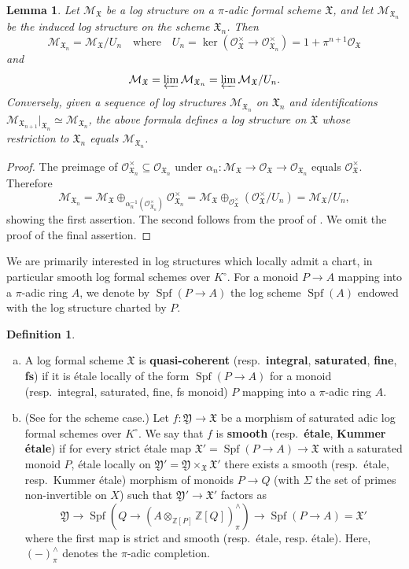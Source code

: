 \documentclass[a4paper,twoside,11pt,reqno]{amsart}
\renewcommand{\mathbb}{\mathds}
\newcommand{\bZ}{{\mathbb Z}}
\newcommand{\cM}{{\mathcal M}}
\newcommand{\cO}{{\mathcal O}}
\newcommand{\fX}{{\mathfrak{X}}}
\newcommand{\fY}{{\mathfrak{Y}}}
\newcommand{\la}{\longrightarrow}
\DeclareMathOperator{\Spf}{Spf}
\newtheorem{lem}[thm]{Lemma}
\theoremstyle{definition}
\newtheorem{defi}[thm]{Definition}
\numberwithin{equation}{subsection}
\begin{document}
\begin{lem} \label{lem:log-fsch-equiv}
    Let $\cM_\fX$ be a log structure on a $\pi$-adic formal scheme $\fX$, and let $\cM_{\fX_n}$ be the induced log structure on the scheme $\fX_n$. Then
    \[
    \cM_{\fX_n} = \cM_\fX/U_n
    \quad \text{where} \quad
    U_n = \ker(\cO_{\fX}^\times \to \cO_{\fX_n}^\times) = 1+\pi^{n+1}\cO_\fX
    \]
    and
    \[ 
        \cM_\fX = \varprojlim \cM_{\fX_n} = \varprojlim \cM_\fX/U_n.
    \]
    Conversely, given a sequence of log structures $\cM_{\fX_n}$ on $\fX_n$ and identifications $\cM_{\fX_{n+1}}|_{\fX_{n}} \simeq \cM_{\fX_n}$, the above formula defines a log structure on $\fX$ whose restriction to $\fX_n$ equals $\cM_{\fX_n}$. 
\end{lem}

\begin{proof}
The preimage of $\cO_{\fX_n}^\times\subseteq\cO_{\fX_n}$ under $\alpha_n\colon \cM_{\fX}\to\cO_\fX\to\cO_{\fX_n}$ equals $\cO_\fX^\times$. Therefore
\[
    \cM_{\fX_n} = \cM_\fX \oplus_{\alpha_n^{-1}(\cO_{\fX_n}^\times)} \cO_{\fX_n}^\times = \cM_{\fX} \oplus_{\cO_{\fX}^\times} (\cO_{\fX}^\times/U_n) = \cM_\fX/U_n,
\]
showing the first assertion. The second follows from the proof of \cite[Proposition~7.8]{Fersi}. 
We omit the proof of the final assertion.
\end{proof}

We are primarily interested in log structures which locally admit a chart, in particular smooth log formal schemes over $K^\circ$. For a monoid $P\to A$ mapping into a $\pi$-adic ring $A$, we denote by $\Spf(P\to A)$ the log scheme $\Spf(A)$ endowed with the log structure charted by $P$. 

\begin{defi}
    \begin{enumerate}[(a)]
        \item A log formal scheme $\fX$ is {\bf quasi-coherent} (resp.\ {\bf integral}, {\bf saturated}, {\bf fine}, {\bf fs}) if it is \'etale locally of the form $\Spf(P\to A)$ for a monoid (resp.\ integral, saturated, fine, fs monoid) $P$ mapping into a $\pi$-adic ring $A$.
        \item (See \cite[Definition~3.5.1]{AHLS-Log} for the scheme case.) Let $f\colon \fY\to\fX$ be a morphism of saturated adic log formal schemes over $K^\circ$. We say that $f$ is {\bf smooth} (resp.\ {\bf \'etale}, {\bf Kummer \'etale}) if for every strict \'etale map $\fX' = \Spf(P\to A)\to\fX$ with a saturated monoid $P$, \'etale locally on $\fY' = \fY\times_\fX\fX'$ there exists a  smooth (resp.\ \'etale, resp.\ Kummer \'etale) morphism of monoids $P\to Q$ (with $\Sigma$ the set of primes non-invertible on $X$) such that $\fY'\to\fX'$ factors as
    \[
        \fY\la \Spf\left(Q\to (A\otimes_{\bZ[P]}\bZ[Q])^\wedge_\pi\right) \to \Spf(P\to A) = \fX'
    \]
    where the first map is strict and smooth (resp.\ \'etale, resp. \'etale). Here, $(-)^\wedge_\pi$ denotes the $\pi$-adic completion.  
    \end{enumerate}
\end{defi}
\end{document}

